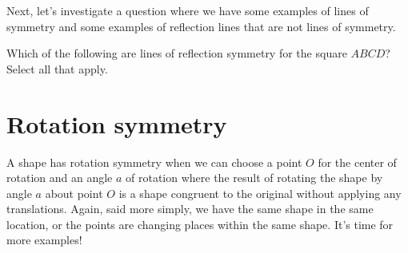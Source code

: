 \documentclass{ximera}
\begin{document}
Next, let's investigate a question where we have some examples of lines of symmetry and some examples of reflection lines that are not lines of symmetry.

\begin{question}
Which of the following are lines of reflection symmetry for the square $ABCD$? Select all that apply.
\begin{image}
\end{image}
\end{question}

\begin{selectAll}
\end{selectAll}


\section{Rotation symmetry}


A shape has rotation symmetry when we can choose a point $O$ for the center of rotation and an angle $a$ of rotation where the result of rotating the shape by angle $a$ about point $O$ is a shape congruent to the original without applying any translations. Again, said more simply, we have the same shape in the same location, or the points are changing places within the same shape. It's time for more examples!
\end{document}
